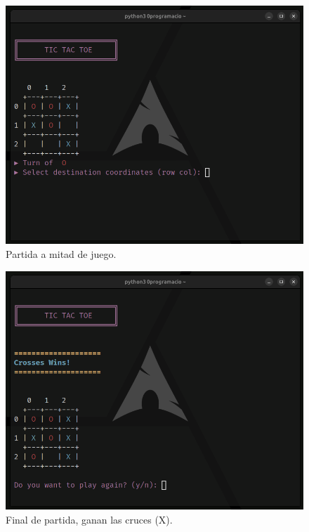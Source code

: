 \documentclass[a4paper,12pt]{article}
\begin{document}
\begin{figure}[htbp]
    \centering
    \includegraphics[scale=0.45]{./imagenes/partida.png}
    \caption{Partida a mitad de juego.}\label{fig:partida}
\end{figure}
\begin{figure}[htbp]
    \centering
    \includegraphics[scale=0.45]{./imagenes/final_partida.png}
    \caption{Final de partida, ganan las cruces (X).}\label{fig:final_partida}
\end{figure}
\newpage
\end{document}
